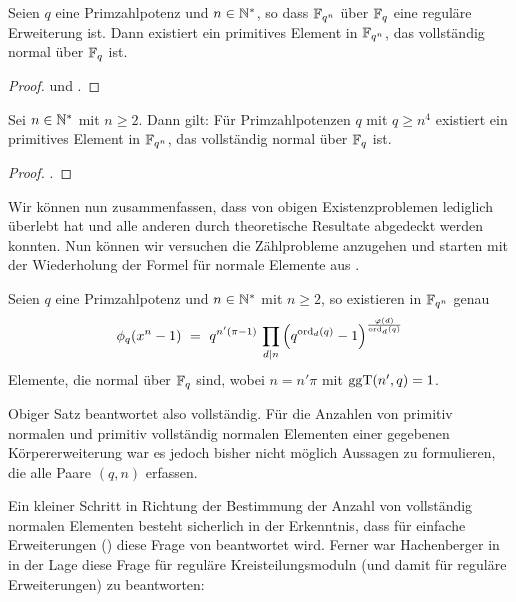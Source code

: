 \begin{satz}
  \label{satz:pcn_in_regular}
  Seien $q$ eine Primzahlpotenz und $n \in \mathbb{N}^\ast$, so dass
  $\mathbb{F}_{q^n}$ über $\mathbb{F}_q$ eine reguläre Erweiterung ist. 
  Dann existiert ein
  primitives Element in $\mathbb{F}_{q^n}$, das vollständig normal über $\mathbb{F}_q$ ist.
\end{satz}
\begin{proof}
  \autocite[Theorem 1.4]{hachenberger2001} und 
  \autocite{hachenberger2014regexc}.
\end{proof}


\begin{satz}
  \label{satz:pcn_schranke}
  Sei $n\in \mathbb{N}^\ast$ mit $n\geq 2$. Dann gilt:
  Für Primzahlpotenzen $q$ mit $q \geq n^4$ existiert ein primitives Element in 
  $\mathbb{F}_{q^n}$, das vollständig normal über $\mathbb{F}_q$ ist.
\end{satz}
\begin{proof}
  \autocite[Theorem 2]{hachenberger2014}.
\end{proof}

Wir können nun zusammenfassen, dass von obigen Existenzproblemen lediglich
 überlebt hat und alle anderen durch theoretische Resultate
abgedeckt werden konnten. Nun können wir versuchen die Zählprobleme anzugehen
und starten mit der Wiederholung der Formel für normale Elemente aus
.

\begin{satz}
  Seien $q$ eine Primzahlpotenz und $n\in \mathbb{N}^\ast$ mit $n\geq 2$, so existieren
  in $\mathbb{F}_{q^n}$ genau 
  \[ \phi_q(x^n-1) \ =\  q^{n'(\pi-1)}\,\prod_{d\mid n}
    \left( q^{\operatorname{ord}_d(q)} -1 \right)^{\frac{\varphi(d)}{\operatorname{ord}_d(q)}}\]
  Elemente, die normal über $\mathbb{F}_q$ sind, wobei $n = n'\pi$ mit $\operatorname{ggT}(n',q) = 1$.
\end{satz}

Obiger Satz beantwortet also  vollständig. Für die Anzahlen von 
primitiv normalen und primitiv vollständig normalen Elementen einer gegebenen
Körpererweiterung war es jedoch bisher nicht möglich Aussagen zu formulieren,
die alle Paare $(q,n)$ erfassen.

Ein kleiner Schritt in Richtung der Bestimmung der 
Anzahl von vollständig normalen Elementen 
besteht sicherlich in der Erkenntnis, dass für einfache Erweiterungen
() diese Frage von  beantwortet
wird. Ferner war Hachenberger in \autocite[Section 21]{hachenberger1997finite}
in der Lage diese Frage für reguläre Kreisteilungsmoduln (und damit für
reguläre Erweiterungen) zu beantworten:

